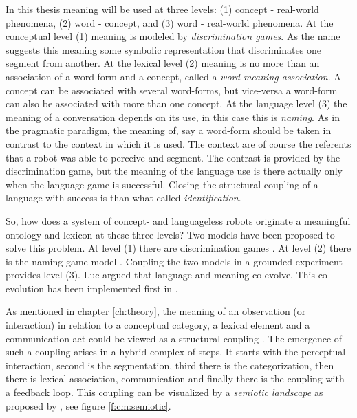 In this thesis meaning will be used at three levels: (1) concept - real-world phenomena, (2) word - concept, and (3) word - real-world phenomena. At the conceptual level (1) meaning is modeled by {\em discrimination games}. As the name suggests this meaning some symbolic representation that discriminates one segment from another. At the lexical level (2) meaning is no more than an association of a word-form and a concept, called a {\em word-meaning association}. A concept can be associated with several word-forms, but vice-versa a word-form can also be associated with more than one concept. At the language level (3) the meaning of a conversation depends on its use, in this case this is {\em naming}. As in the pragmatic paradigm, the meaning of, say a word-form should be taken in contrast to the context in which it is used. The context are of course the referents that a robot was able to perceive and segment. The contrast is provided by the discrimination game, but the meaning of the language use is there actually only when the language game is successful. Closing the structural coupling of a language with success is than what  called {\em identification}.

\p
So, how does a system of concept- and languageless robots originate a meaningful ontology and lexicon at these three levels? Two models have been proposed to solve this problem. At level (1) there are discrimination games \cite{steels:1996b}. At level (2) there is the naming game model \cite{steels:1996a}. Coupling the two models in a grounded experiment provides level (3). Luc  argued that language and meaning co-evolve. This co-evolution has been implemented first in \cite{steelsvogt:1997}. 

As mentioned in chapter \ref{ch:theory}, the meaning of an observation (or interaction) in relation to a conceptual category, a lexical element and a communication act could be viewed as a structural coupling \cite{maturanavarela:1992}. The emergence of such a coupling arises in a hybrid complex of steps. It starts with the perceptual interaction, second is the segmentation, third there is the categorization, then there is lexical association, communication and finally there is the coupling with a feedback loop. This coupling can be visualized by a {\em semiotic landscape} as proposed by \cite{steels:2000}, see figure \ref{f:cm:semiotic}.


